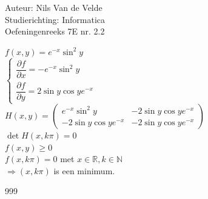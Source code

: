 \documentclass[a4paper]{article}
\newcommand{\N}{\mathbb{N}}
\newcommand{\R}{\mathbb{R}}
\begin{document}
  
\noindent \large Auteur: Nils Van de Velde \\
\noindent \large Studierichting: Informatica\\
\noindent \large Oefeningenreeks 7E nr. 2.2\\

\medskip

\normalsize

$f(x,y)=e^{-x}\sin^2y$\\

$\left\{
\begin{array}{l}
	\dfrac{\partial f}{\partial x} = -e^{-x}\sin^2y \\
	\dfrac{\partial f}{\partial y} = 2\sin y\cos ye^{-x}
\end{array}
\right.$\\

$H(x,y) = \left(
\begin{array}{ccc}
	e^{-x}\sin^2y & -2\sin y\cos ye^{-x} \\
	-2\sin y\cos ye^{-x} & -2\sin y\cos ye^{-x}
\end{array}
\right)$\\

$\det H(x,k\pi) = 0$\\

$f(x,y) \ge 0$\\

$f(x,k\pi)=0$ met $x \in \R, k \in \N$\\

$\Rightarrow (x,k\pi)$ is een minimum.\\

\begin{thebibliography}{999}
\end{thebibliography}
\end{document}
